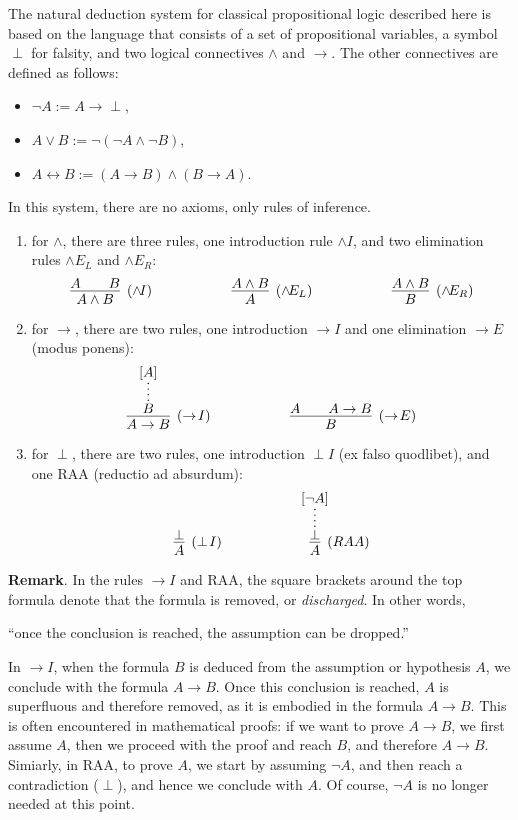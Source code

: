 \documentclass[12pt]{article}
\begin{document}
The natural deduction system for classical propositional logic described here is based on the language that consists of a set of propositional variables, a symbol $\perp$ for falsity, and two logical connectives $\land$ and $\to$.  The other connectives are defined as follows:
\begin{itemize}
\item $\neg A := A\to \perp$,
\item $A\lor B:= \neg (\neg A \land \neg B)$,
\item $A\leftrightarrow B:=(A\to B)\land (B\to A)$.
\end{itemize}

In this system, there are no axioms, only rules of inference.
\begin{enumerate}
\item for $\land$, there are three rules, one introduction rule $\land\!I$, and two elimination rules $\land\! E_L$ and $\land\! E_R$:
$$\infer[(\land\!I)]{A\land B}{A & \quad B} \hspace{2cm} \infer[(\land\!E_L)]{A}{A \land B}  \hspace{2cm} \infer[(\land\!E_R)]{B}{A \land B}$$
\item for $\to$, there are two rules, one introduction $\to\!I$ and one elimination $\to\!E$ (modus ponens):
$$ \infer[(\to\!I)]{A\to B}{\infer*{B}{[A]}} \hspace{2cm} \infer[(\to\!E)]{B}{A & \quad A \rightarrow B}$$
\item for $\perp$, there are two rules, one introduction $\perp\!I$ (ex falso quodlibet), and one RAA (reductio ad absurdum):
$$\infer[(\perp\!I)]{A}{\perp} \hspace{2cm} \infer[(RAA)]{A}{\infer*{\perp}{[\neg A]}}$$
\end{enumerate}
\textbf{Remark}.  In the rules $\to\!I$ and RAA, the square brackets around the top formula denote that the formula is removed, or \emph{discharged}.  In other words,
\begin{center}
``once the conclusion is reached, the assumption can be dropped.''  
\end{center}
In $\to\!I$, when the formula $B$ is deduced from the assumption or hypothesis $A$, we conclude with the formula $A\to B$.  Once this conclusion is reached, $A$ is superfluous and therefore removed, as it is embodied in the formula $A\to B$.  This is often encountered in mathematical proofs: if we want to prove $A\to B$, we first assume $A$, then we proceed with the proof and reach $B$, and therefore $A\to B$.  Simiarly, in RAA, to prove $A$, we start by assuming $\neg A$, and then reach a contradiction ($\perp$), and hence we conclude with $A$.  Of course, $\neg A$ is no longer needed at this point.
\end{document}
